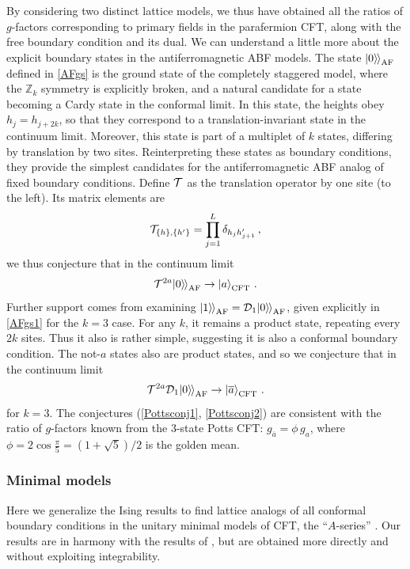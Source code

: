 By considering two distinct lattice models, we thus have obtained all the ratios of $g$-factors corresponding to primary fields in the parafermion CFT, along with the free boundary condition and its dual. We can understand a little more about the explicit boundary states in 
the antiferromagnetic ABF models.
The state ${|{0}\rangle\mkern-2mu\rangle}_{\rm AF}$ defined in \eqref{AFgs} is the ground state of the completely staggered model, where the $\mathbb{Z}_k$ symmetry is explicitly broken, and a natural candidate for a state becoming a Cardy state in the conformal limit.
In this state, the heights obey $h_j=h_{j+2k}$, so that they correspond to a translation-invariant state in the continuum limit.
Moreover, this state is part of a multiplet of $k$ states, differing by translation by two sites.
Reinterpreting these states as boundary conditions, they provide the simplest candidates for the antiferromagnetic ABF analog of fixed boundary conditions.
Define $\mathcal{T}$ as the translation operator by one site (to the left).
Its matrix elements are
\begin{align}
	{\mathcal{T}}_{\{h\},\{h'\}} = \prod_{j=1}^{L} \delta_{h_j h'_{j+1}} \,,
\label{transdef}
\end{align}
we thus conjecture that in the continuum limit
\begin{align}
\mathcal{T}^{2a} {|{0}\rangle\mkern-2mu\rangle}_{\rm AF} \to \ket{a}_{\rm CFT}^{} \,.
\label{Pottsconj1}
\end{align}
Further support comes from examining ${|{1}\rangle\mkern-2mu\rangle}_{\rm AF}=\mathcal{D}_1{|{0}\rangle\mkern-2mu\rangle}_{\rm AF}$, given explicitly in \eqref{AFgs1} for the $k=3$ case. For any $k$, it remains a product state, repeating every $2k$ sites. Thus it also is rather simple, suggesting it is also a conformal boundary condition. The not-$a$ states also are product states, and so we conjecture that in the continuum limit 
\begin{align}
\mathcal{T}^{2a} \mathcal{D}_1{|{0}\rangle\mkern-2mu\rangle}_{\rm AF} \to \ket{\overline{a}}_{\rm CFT}^{} \,.
\label{Pottsconj2}
\end{align}
for $k=3$. The conjectures (\ref{Pottsconj1}, \ref{Pottsconj2}) are consistent with the ratio of $g$-factors known from the 3-state Potts CFT: $g_{\overline{a}}=\phi\,g_a$, where $\phi=2\cos\tfrac{\pi}{5} = (1+\sqrt{5})/2$ is the golden mean.


\subsubsection{Minimal models}
\label{sec:gmin}
 
Here we generalize the Ising results to find lattice analogs of all conformal boundary conditions in the unitary minimal models of CFT, the ``$A$-series'' \cite{BPZ:CFT:84,DiFrancesco1997}.
Our results are in harmony with the results of \cite{Behrend1998,Behrend2001,Chui2003}, but are obtained more directly and without exploiting integrability.

